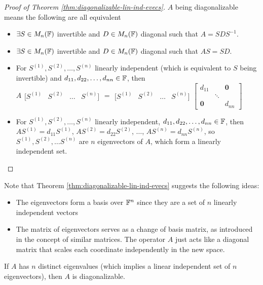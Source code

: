 \begin{proof}[Proof of Theorem \ref{thm:diagonalizable-lin-ind-evecs}]
$A$ being diagonalizable means the following are all equivalent
\begin{itemize}
    \item $\exists S \in M_n(\mathbb F)$ invertible and $D \in M_n(\mathbb F)$ diagonal such that $A = SDS^{-1}$.
    \item $\exists S \in M_n(\mathbb F)$ invertible and $D \in M_n(\mathbb F)$ diagonal such that $AS = SD$.
    \item For $S^{(1)}, S^{(2)}, \dots, S^{(n)}$ linearly independent (which is equivalent to $S$ being invertible) and $d_{11}, d_{22}, \dots, d_{nn} \in \mathbb F$, then $A 
    \begin{array}{c|c|c|c}
    [S^{(1)} & S^{(2)} & \dots & S^{(n)}]
    \end{array} 
    =
    \begin{array}{c|c|c|c}
    [S^{(1)} & S^{(2)} & \dots & S^{(n)}]
    \end{array} 
    \begin{bmatrix}
    d_{11} & & \textbf{0} \\
           & \ddots & \\
         \textbf{0} & & d_{nn}
    \end{bmatrix}
    $
    \item For $S^{(1)}, S^{(2)}, \dots, S^{(n)}$ linearly independent, $d_{11}, d_{22}, \dots, d_{nn} \in \mathbb F$, then $AS^{(1)} = d_{11}S^{(1)}$, $AS^{(2)} = d_{22}S^{(2)}$, $\dots$, $AS^{(n)} = d_{nn}S^{(n)}$, so $S^{(1)}, S^{(2)}, \dots S^{(n)}$ are $n$ eigenvectors of $A$, which form a linearly independent set.
\end{itemize}
\end{proof}

\noindent Note that Theorem \ref{thm:diagonalizable-lin-ind-evecs} suggests the following ideas:
\begin{itemize}
    \item The eigenvectors form a basis over $\mathbb F^n$ since they are a set of $n$ linearly independent vectors
    \item The matrix of eigenvectors serves as a change of basis matrix, as introduced in the concept of similar matrices. The operator $A$ just acts like a diagonal matrix that scales each coordinate independently in the new space.
\end{itemize}

\begin{corollary}
If $A$ has $n$ distinct eigenvalues (which implies a linear independent set of $n$ eigenvectors), then $A$ is diagonalizable.
\end{corollary}


